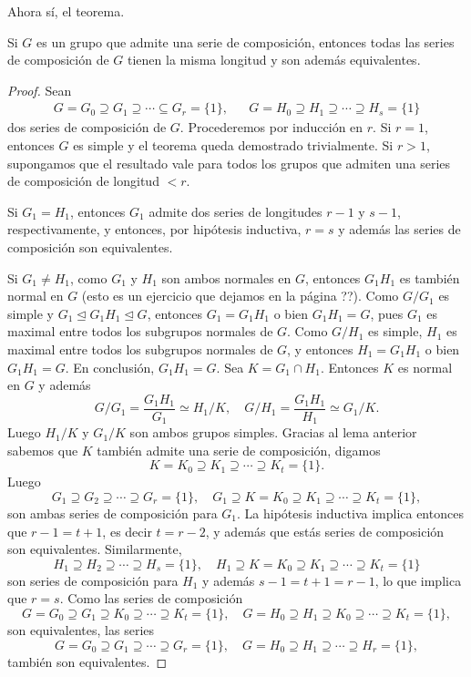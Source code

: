 Ahora sí, el teorema.

\begin{theorem}
Si $G$ es un grupo que admite una serie de composición, entonces todas las series de composición de $G$ tienen la misma longitud y son además equivalentes. 	
\end{theorem}


\begin{proof}
Sean 
\begin{align*}
G=G_0\supseteq G_1\supseteq\cdots\subseteq G_r=\{1\}, &&
G=H_0\supseteq H_1\supseteq\cdots\supseteq H_s=\{1\}	
\end{align*}
dos series de composición de $G$. Procederemos por inducción en $r$. Si $r=1$, entonces $G$ es simple y el teorema queda demostrado trivialmente. Si $r>1$, 
supongamos que el resultado vale para todos los grupos que admiten una series de composición de longitud $<r$. 

Si $G_1=H_1$, entonces $G_1$ admite dos series
de longitudes $r-1$ y $s-1$, respectivamente, y entonces, por hipótesis inductiva, $r=s$ y además las series de composición son equivalentes.  

Si $G_1\ne H_1$, como $G_1$ y $H_1$ son ambos normales en $G$, entonces $G_1H_1$ es también normal en $G$ (esto es un ejercicio que dejamos en la página ??). Como
$G/G_1$ es simple y $G_1\unlhd G_1H_1\unlhd G$, entonces $G_1=G_1H_1$ o bien $G_1H_1=G$, pues $G_1$ es maximal entre todos los subgrupos normales de $G$. Como $G/H_1$ es simple, $H_1$ es maximal entre todos los subgrupos normales de $G$, y entonces $H_1=G_1H_1$ o bien $G_1H_1=G$. En conclusión, $G_1H_1=G$. Sea $K=G_1\cap H_1$.
Entonces $K$ es normal en $G$ y además
\[
G/G_1=\frac{G_1H_1}{G_1}\simeq H_1/K,
\quad
G/H_1=\frac{G_1H_1}{H_1}\simeq G_1/K.
\]
Luego $H_1/K$ y $G_1/K$ son ambos grupos simples. Gracias al lema anterior sabemos que $K$ también admite una serie de composición, digamos
\[
K=K_0\supseteq K_1\supseteq\cdots\supseteq K_t=\{1\}.
\]
Luego 
\[
G_1\supseteq G_2\supseteq\cdots\supseteq G_r=\{1\},
\quad
G_1\supseteq K=K_0\supseteq K_1\supseteq\cdots\supseteq K_t=\{1\},
\]
son ambas series de composición para $G_1$. La hipótesis inductiva implica entonces que $r-1=t+1$, es decir $t=r-2$, y además que estás series de composición son equivalentes. Similarmente, 
\[
H_1\supseteq H_2\supseteq\cdots\supseteq H_s=\{1\},\quad
H_1\supseteq K=K_0\supseteq K_1\supseteq\cdots\supseteq K_t=\{1\}
\]
son series de composición para $H_1$ y además $s-1=t+1=r-1$, lo que implica que $r=s$. Como las series de composición 
\[
G=G_0\supseteq G_1\supseteq K_0\supseteq\cdots\supseteq K_t=\{1\},\quad
G=H_0\supseteq H_1\supseteq K_0\supseteq\cdots\supseteq K_t=\{1\},
\]
son equivalentes, las series
\[
G=G_0\supseteq G_1\supseteq\cdots\supseteq G_r=\{1\},
\quad
G=H_0\supseteq H_1\supseteq\cdots\supseteq H_r=\{1\},
\]
también son equivalentes. 
\end{proof}

